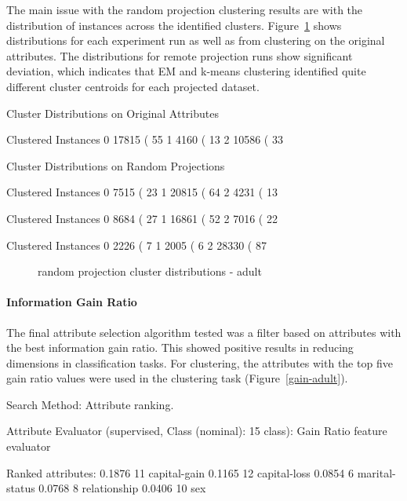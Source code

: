 \documentclass{sig-alternate}
\begin{document}
The main issue with the random projection clustering results are with the distribution of instances across the identified clusters. Figure~\ref{rp-custer-dist-adult} shows distributions for each experiment run as well as from clustering on the original attributes. The distributions for remote projection runs show significant deviation, which indicates that EM and k-means clustering identified quite different cluster centroids for each projected dataset.

\begin{verbbox}
Cluster Distributions on Original Attributes

Clustered Instances
0      17815 ( 55%
1       4160 ( 13%
2      10586 ( 33%


Cluster Distributions on Random Projections

Clustered Instances
0       7515 ( 23%
1      20815 ( 64%
2       4231 ( 13%

Clustered Instances
0       8684 ( 27%
1      16861 ( 52%
2       7016 ( 22%

Clustered Instances
0       2226 (  7%
1       2005 (  6%
2      28330 ( 87%
\end{verbbox}

\begin{figure}[!htbp]
    \centering
    \theverbbox
    \caption{random projection cluster distributions - adult\label{rp-custer-dist-adult}}
\end{figure}


\paragraph{Information Gain Ratio}

The final attribute selection algorithm tested was a filter based on attributes with the best information gain ratio. This showed positive results in reducing dimensions in classification tasks. For clustering, the attributes with the top five gain ratio values were used in the clustering task (Figure~\ref{gain-adult}).

\begin{verbbox}
Search Method:
    Attribute ranking.

Attribute Evaluator (supervised, Class (nominal): 15 class):
    Gain Ratio feature evaluator

Ranked attributes:
 0.1876  11 capital-gain
 0.1165  12 capital-loss
 0.0854   6 marital-status
 0.0768   8 relationship
 0.0406  10 sex
\end{verbbox}
\normalsize
\end{document}
